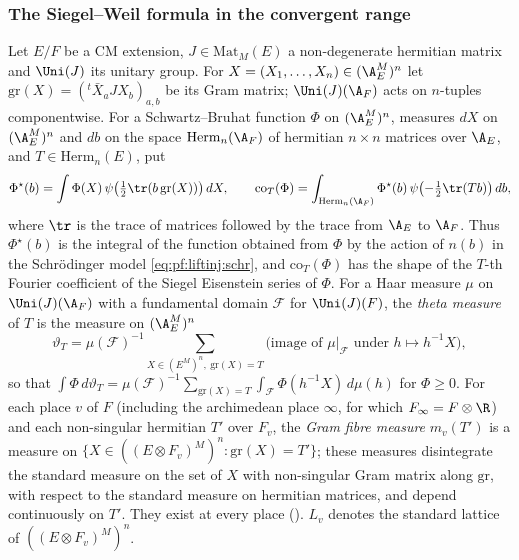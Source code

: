 \subsubsection{The Siegel--Weil formula in the convergent range}\label{sec:pf:liftinj:swsec}

Let $E/F$ be a CM extension, $J\in\mathrm{Mat}_M(E)$ a non-degenerate hermitian matrix and $\Uni(J)$ its unitary group. For
$X=(X_1,\dots,X_n)\in(\A_E^M)^n$ let $\mathrm{gr}(X)=({}^t\bar X_aJX_b)_{a,b}$ be its Gram matrix; $\Uni(J)(\A_F)$ acts on $n$-tuples
componentwise. For a Schwartz--Bruhat function $\Phi$ on $(\A_E^M)^n$, measures $dX$ on $(\A_E^M)^n$ and $db$ on the space
$\mathrm{Herm}_n(\A_F)$ of hermitian $n\times n$ matrices over $\A_E$, and $T\in\mathrm{Herm}_n(E)$, put
\begin{equation}\label{eq:pf:liftinj:coefN}
\Phi^\star(b)=\int\Phi(X)\,\psi\bigl(\tfrac12\tr(b\,\mathrm{gr}(X))\bigr)\,dX,\qquad
\mathrm{co}_T(\Phi)=\int_{\mathrm{Herm}_n(\A_F)}\Phi^\star(b)\,\psi\bigl(-\tfrac12\tr(Tb)\bigr)\,db,
\end{equation}
where $\tr$ is the trace of matrices followed by the trace from $\A_E$ to $\A_F$. Thus $\Phi^\star(b)$ is the integral of the function
obtained from $\Phi$ by the action of $n(b)$ in the Schr\"odinger model \eqref{eq:pf:liftinj:schr}, and $\mathrm{co}_T(\Phi)$ has the shape of
the $T$-th Fourier coefficient of the Siegel Eisenstein series of $\Phi$. For a Haar measure $\mu$ on $\Uni(J)(\A_F)$ with a fundamental domain
$\mathcal F$ for $\Uni(J)(F)$, the \emph{theta measure} of $T$ is the measure on $(\A_E^M)^n$
\begin{equation}\label{eq:pf:liftinj:thetameas}
\vartheta_T=\mu(\mathcal F)^{-1}\sum_{X\in(E^M)^n,\ \mathrm{gr}(X)=T}\bigl(\text{image of }\mu|_{\mathcal F}\text{ under }h\mapsto h^{-1}X\bigr),
\end{equation}
so that $\int\Phi\,d\vartheta_T=\mu(\mathcal F)^{-1}\sum_{\mathrm{gr}(X)=T}\int_{\mathcal F}\Phi(h^{-1}X)\,d\mu(h)$ for $\Phi\ge0$. For each place
$v$ of $F$ (including the archimedean place $\infty$, for which $F_\infty=F\otimes\R$) and each non-singular hermitian $T'$ over $F_v$, the
\emph{Gram fibre measure} $m_v(T')$ is a measure on $\{X\in((E\otimes F_v)^M)^n:\mathrm{gr}(X)=T'\}$; these measures disintegrate the standard
measure on the set of $X$ with non-singular Gram matrix along $\mathrm{gr}$, with respect to the standard measure on hermitian matrices, and
depend continuously on $T'$. They exist at every place (). $L_v$ denotes the
standard lattice of $((E\otimes F_v)^M)^n$.

